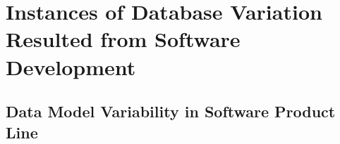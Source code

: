 \section{Instances of Database Variation Resulted from Software Development}
\label{sec:varsoft}




\subsection{Data Model Variability in Software Product Line}
\label{sec:spl}


\begin{comment}
--------------------------------------------------------------------------------------
bridging the gap between variability in client application and 
database schema~\cite{skrhas09DBIS}:
- focuses on data model (schema) without really having a database
- shows that traditional modeling techniques aren't sufficient for expressing
a variable schema
- applies SPL methodology to schemas and allows the generation of 
tailor-made schemas
- using a global schema for all variants of the client application 
leads to a gap bw variability in client application and schema
- problems with global: 1) high variability the global schema will be large
and complex, it doesn't scale. 2) the maintainability is reduced b/c
it is difficult to understand and change a global sch that is fixed
for all variants 3) the lack of separation of concerns and thus the 
suboptimal traceability of requirements of database schema elements
complicate developement and evolution which may in turn hinder application
developers to introdcue new variants in the application 
- focuses on separation of concern on the level of conceptual modeling
so that one can trace features not only to the impelementation level
but also to database schema elements. so in the target schema for a 
application variant only the required database schema elements 
should be included
- demonstrates the problem of database schema variability
- they propose two decomposition approaches: 
1) physically: schema elements are stored in sparate files, one file
per feature. to generate a schema for a specific variant fiels corresponding
to the feature selection are composed. this is well-suited for prjs starting
from the scratch, prjs with many alternative features, and prjs where 
third-party developers are involved.
 and 2) virtually: schema elements in ER (Entity Relationship) model
  are annotated with features.
 to generate a variant for a given feature selection, the annotations
 are evaluated and elements that aren't necessary are removed.
 the resulting schema in a the deployed variant is a subset of the 
 global schema. this approach can easily be adopted if there is 
 already an existing database schema b/c it makes minimal changes to 
 the development process and can easily be adopted in an industrial
 scenario.


\end{comment}
